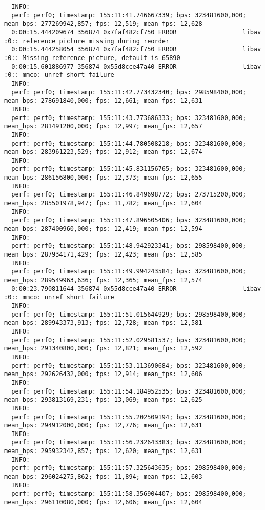 \documentclass[12pt,oneside]{book}
\begin{document}
\begin{lstlisting}
  INFO:
  perf: perf0; timestamp: 155:11:41.746667339; bps: 323481600,000; mean_bps: 277269942,857; fps: 12,519; mean_fps: 12,628
  0:00:15.444209674 356874 0x7faf482cf750 ERROR                  libav :0:: reference picture missing during reorder
  0:00:15.444258054 356874 0x7faf482cf750 ERROR                  libav :0:: Missing reference picture, default is 65890
  0:00:15.601886977 356874 0x55d8cce47a40 ERROR                  libav :0:: mmco: unref short failure
  INFO:
  perf: perf0; timestamp: 155:11:42.773432340; bps: 298598400,000; mean_bps: 278691840,000; fps: 12,661; mean_fps: 12,631
  INFO:
  perf: perf0; timestamp: 155:11:43.773686333; bps: 323481600,000; mean_bps: 281491200,000; fps: 12,997; mean_fps: 12,657
  INFO:
  perf: perf0; timestamp: 155:11:44.780508218; bps: 323481600,000; mean_bps: 283961223,529; fps: 12,912; mean_fps: 12,674
  INFO:
  perf: perf0; timestamp: 155:11:45.831156765; bps: 323481600,000; mean_bps: 286156800,000; fps: 12,373; mean_fps: 12,655
  INFO:
  perf: perf0; timestamp: 155:11:46.849698772; bps: 273715200,000; mean_bps: 285501978,947; fps: 11,782; mean_fps: 12,604
  INFO:
  perf: perf0; timestamp: 155:11:47.896505406; bps: 323481600,000; mean_bps: 287400960,000; fps: 12,419; mean_fps: 12,594
  INFO:
  perf: perf0; timestamp: 155:11:48.942923341; bps: 298598400,000; mean_bps: 287934171,429; fps: 12,423; mean_fps: 12,585
  INFO:
  perf: perf0; timestamp: 155:11:49.994243584; bps: 323481600,000; mean_bps: 289549963,636; fps: 12,365; mean_fps: 12,574
  0:00:23.790811644 356874 0x55d8cce47a40 ERROR                  libav :0:: mmco: unref short failure
  INFO:
  perf: perf0; timestamp: 155:11:51.015644929; bps: 298598400,000; mean_bps: 289943373,913; fps: 12,728; mean_fps: 12,581
  INFO:
  perf: perf0; timestamp: 155:11:52.029581537; bps: 323481600,000; mean_bps: 291340800,000; fps: 12,821; mean_fps: 12,592
  INFO:
  perf: perf0; timestamp: 155:11:53.113690684; bps: 323481600,000; mean_bps: 292626432,000; fps: 12,914; mean_fps: 12,606
  INFO:
  perf: perf0; timestamp: 155:11:54.184952535; bps: 323481600,000; mean_bps: 293813169,231; fps: 13,069; mean_fps: 12,625
  INFO:
  perf: perf0; timestamp: 155:11:55.202509194; bps: 323481600,000; mean_bps: 294912000,000; fps: 12,776; mean_fps: 12,631
  INFO:
  perf: perf0; timestamp: 155:11:56.232643383; bps: 323481600,000; mean_bps: 295932342,857; fps: 12,620; mean_fps: 12,631
  INFO:
  perf: perf0; timestamp: 155:11:57.325643635; bps: 298598400,000; mean_bps: 296024275,862; fps: 11,894; mean_fps: 12,603
  INFO:
  perf: perf0; timestamp: 155:11:58.356904407; bps: 298598400,000; mean_bps: 296110080,000; fps: 12,606; mean_fps: 12,604

\end{lstlisting}
\end{document}
